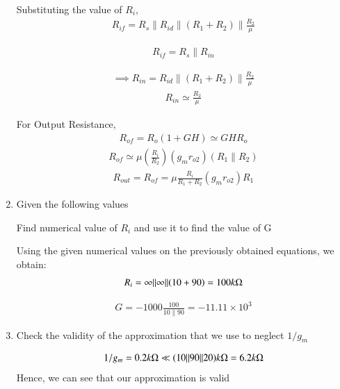 \begin{enumerate}[label=\thesubsection.\arabic*.,ref=\thesubsection.\theenumi]
Substituting the value of $R_{i}$,
\begin{align}
    R_{if}=R_{s}\|R_{id}\|(R_{1}+R_{2}) \| \frac{R_{2}}{\mu}
\end{align}

\begin{align}
    R_{if}=R_{s} \| R_{in}
\end{align}

\begin{align}
    \implies R_{in}=R_{i d}\|(R_{1}+R_{2})\| \frac{R_{2}}{\mu}
\end{align}
\begin{align}
    R_{in} \simeq \frac{R_{2}}{\mu}
\end{align}

For Output Resistance,
\begin{align}
    R_{of}=R_{o}(1+GH) \simeq GH R_{o}
\end{align}
\begin{align}
    R_{of} \simeq \mu (\frac{R_{i}}{R_{2}})(g_{m} r_{o 2})(R_{1} \| R_{2})
\end{align}
\begin{align}
    R_{out} = R_{of}=\mu \frac{R_{i}}{R_{1}+R_{2}}(g_{m} r_{o 2}) R_{1}
\end{align}


\item
Given the following values
\begin{table}[!ht]
\centering

\caption{}
\label{table: Input_Table}
\end{table}

Find numerical value of $R_{i}$ and use it to find the value of G

\solution
Using the given numerical values on the previously obtained equations, we obtain:
\begin{align}
    R_{i}=\infty\|\infty\|(10+90)=100 k\ohm
\end{align}

\begin{align}
    G =-1000 \frac{100}{10 \| 90}=-11.11 \times 10^{3}
\end{align}

\item 
Check the validity of the approximation that we use to neglect $1/g_{m}$

\solution
\begin{align}
    1 / g_{m}=0.2 k\ohm \ll (10\|90\| 20)k\ohm = 6.2k\ohm
\end{align}
Hence, we can see that our approximation is valid


\end{enumerate}
